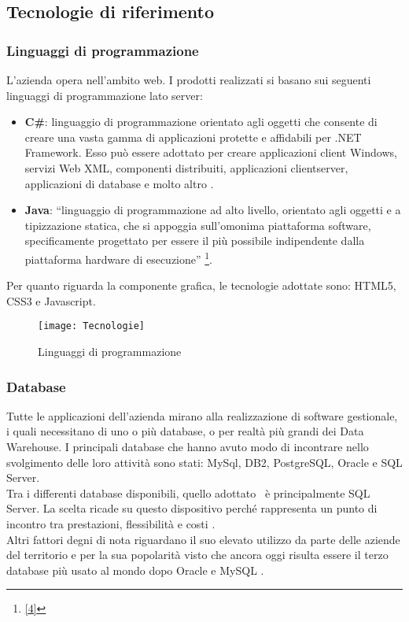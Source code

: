 \subsection{Tecnologie di riferimento}
\label{cap1:Tecnologie di riferimento}
\subsubsection*{Linguaggi di programmazione}

L'azienda opera nell'ambito web. I prodotti realizzati si basano sui seguenti linguaggi di programmazione lato server: 
\begin{itemize}
	\item \textbf{C\#}: linguaggio di programmazione orientato agli oggetti che consente di creare una vasta gamma di applicazioni protette e affidabili per .NET Framework. Esso può essere adottato per creare applicazioni client Windows, servizi Web XML, componenti distribuiti, applicazioni client\-server, applicazioni di database e molto altro \hyperref[bib3]{\cite{[3]}}.
	
	\item \textbf{Java}: ``linguaggio di programmazione ad alto livello, orientato agli oggetti e a tipizzazione statica, che si appoggia sull'omonima piattaforma software, specificamente progettato per essere il più possibile indipendente dalla piattaforma hardware di esecuzione'' \footnote[1]{\hyperref[bib4]{[4]}}.
\end{itemize}

Per quanto riguarda la componente grafica, le tecnologie adottate sono: HTML5, CSS3 e Javascript.

\begin{figure}[!h] 
	\centering 
	\texttt{[image: Tecnologie]} 
	\caption{Linguaggi di programmazione}
	\label{tecnologie}
\end{figure}

\subsubsection*{Database}
Tutte le applicazioni dell'azienda mirano alla realizzazione di software gestionale, i quali necessitano di uno o più database, o per realtà più grandi dei Data Warehouse. I principali  database che hanno avuto modo di incontrare nello svolgimento delle loro attività sono stati: MySql, DB2, PostgreSQL, Oracle e SQL Server.\\

Tra i differenti database disponibili, quello adottato \azienda\ è principalmente SQL Server. La scelta ricade su questo dispositivo perché rappresenta un punto di incontro tra prestazioni, flessibilità e costi \hyperref[bib5]{\cite{[5]}}.\\
Altri fattori degni di nota riguardano il suo elevato utilizzo da parte delle aziende del territorio e per la sua popolarità visto che ancora oggi risulta essere il terzo database più usato al mondo dopo Oracle e MySQL \hyperref[bib6]{\cite{[6]}}. 

